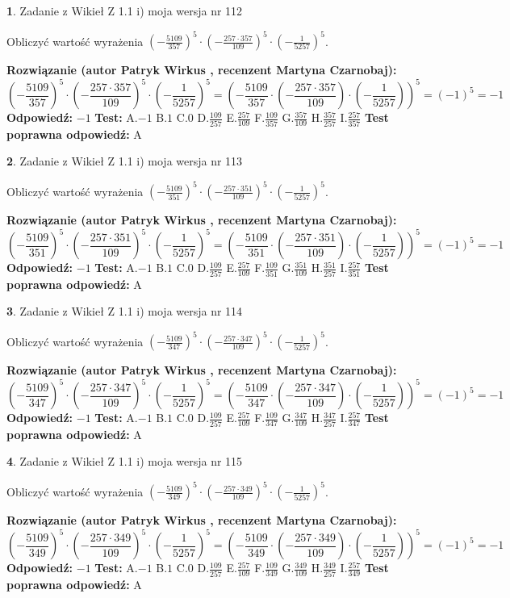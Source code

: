 \documentclass[12pt, a4paper]{article}
\theoremstyle{definition} %
\newtheorem{zad}{}
\newcommand{\zadStart}[1]{\begin{zad}#1\newline}
\newcommand{\zadStop}{\end{zad}}
\newcommand{\rozwStart}[2]{\noindent \textbf{Rozwiązanie (autor #1 , recenzent #2): }\newline}
\newcommand{\rozwStop}{\newline}
\newcommand{\odpStart}{\noindent \textbf{Odpowiedź:}\newline}
\newcommand{\odpStop}{\newline}
\newcommand{\testStart}{\noindent \textbf{Test:}\newline}
\newcommand{\testStop}{\newline}
\newcommand{\kluczStart}{\noindent \textbf{Test poprawna odpowiedź:}\newline}
\newcommand{\kluczStop}{\newline}
\begin{document}
\zadStart{Zadanie z Wikieł Z 1.1 i) moja wersja nr 112}

Obliczyć wartość wyrażenia $(-\frac{5109}{357})^{5} \cdot (-\frac{257 \cdot 357}{109})^{5} \cdot (-\frac{1}{5257})^{5}$.
\zadStop
\rozwStart{Patryk Wirkus}{Martyna Czarnobaj}
$$(-\frac{5109}{357})^{5} \cdot (-\frac{257 \cdot 357}{109})^{5} \cdot (-\frac{1}{5257})^{5} = (-\frac{5109}{357} \cdot (-\frac{257 \cdot 357}{109}) \cdot (-\frac{1}{5257}))^{5} = (-1)^{5} = -1$$
\rozwStop
\odpStart
$-1$
\odpStop
\testStart
A.$-1$ B.$1$ C.$0$ D.$\frac{109}{257}$ E.$\frac{257}{109}$
F.$\frac{109}{357}$ G.$\frac{357}{109}$
H.$\frac{357}{257}$
I.$\frac{257}{357}$
\testStop
\kluczStart
A
\kluczStop



\zadStart{Zadanie z Wikieł Z 1.1 i) moja wersja nr 113}

Obliczyć wartość wyrażenia $(-\frac{5109}{351})^{5} \cdot (-\frac{257 \cdot 351}{109})^{5} \cdot (-\frac{1}{5257})^{5}$.
\zadStop
\rozwStart{Patryk Wirkus}{Martyna Czarnobaj}
$$(-\frac{5109}{351})^{5} \cdot (-\frac{257 \cdot 351}{109})^{5} \cdot (-\frac{1}{5257})^{5} = (-\frac{5109}{351} \cdot (-\frac{257 \cdot 351}{109}) \cdot (-\frac{1}{5257}))^{5} = (-1)^{5} = -1$$
\rozwStop
\odpStart
$-1$
\odpStop
\testStart
A.$-1$ B.$1$ C.$0$ D.$\frac{109}{257}$ E.$\frac{257}{109}$
F.$\frac{109}{351}$ G.$\frac{351}{109}$
H.$\frac{351}{257}$
I.$\frac{257}{351}$
\testStop
\kluczStart
A
\kluczStop



\zadStart{Zadanie z Wikieł Z 1.1 i) moja wersja nr 114}

Obliczyć wartość wyrażenia $(-\frac{5109}{347})^{5} \cdot (-\frac{257 \cdot 347}{109})^{5} \cdot (-\frac{1}{5257})^{5}$.
\zadStop
\rozwStart{Patryk Wirkus}{Martyna Czarnobaj}
$$(-\frac{5109}{347})^{5} \cdot (-\frac{257 \cdot 347}{109})^{5} \cdot (-\frac{1}{5257})^{5} = (-\frac{5109}{347} \cdot (-\frac{257 \cdot 347}{109}) \cdot (-\frac{1}{5257}))^{5} = (-1)^{5} = -1$$
\rozwStop
\odpStart
$-1$
\odpStop
\testStart
A.$-1$ B.$1$ C.$0$ D.$\frac{109}{257}$ E.$\frac{257}{109}$
F.$\frac{109}{347}$ G.$\frac{347}{109}$
H.$\frac{347}{257}$
I.$\frac{257}{347}$
\testStop
\kluczStart
A
\kluczStop



\zadStart{Zadanie z Wikieł Z 1.1 i) moja wersja nr 115}

Obliczyć wartość wyrażenia $(-\frac{5109}{349})^{5} \cdot (-\frac{257 \cdot 349}{109})^{5} \cdot (-\frac{1}{5257})^{5}$.
\zadStop
\rozwStart{Patryk Wirkus}{Martyna Czarnobaj}
$$(-\frac{5109}{349})^{5} \cdot (-\frac{257 \cdot 349}{109})^{5} \cdot (-\frac{1}{5257})^{5} = (-\frac{5109}{349} \cdot (-\frac{257 \cdot 349}{109}) \cdot (-\frac{1}{5257}))^{5} = (-1)^{5} = -1$$
\rozwStop
\odpStart
$-1$
\odpStop
\testStart
A.$-1$ B.$1$ C.$0$ D.$\frac{109}{257}$ E.$\frac{257}{109}$
F.$\frac{109}{349}$ G.$\frac{349}{109}$
H.$\frac{349}{257}$
I.$\frac{257}{349}$
\testStop
\kluczStart
A
\kluczStop
\end{document}
